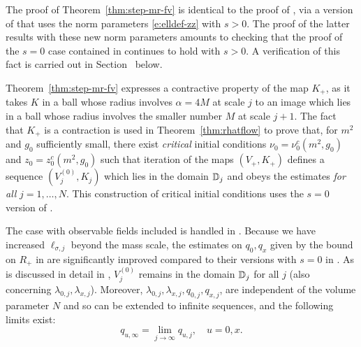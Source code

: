 The proof of Theorem~\ref{thm:step-mr-fv} is identical to the proof of
\cite[Theorem~\ref{phi4-thm:step-mr-fv}]{ST-phi4}, via a version of
\cite[Theorems~\ref{step-thm:mr-R}--\ref{step-thm:mr}]{BS-rg-step} that
uses the norm parameters \eqref{e:elldef-zz} with $s > 0$.
The proof of the latter results with these new norm parameters amounts to
checking that the proof of the $s = 0$ case contained in \cite{BS-rg-IE,BS-rg-step}
continues to hold with $s > 0$. A verification of this fact is carried
out in Section~\REF %
below.

Theorem~\ref{thm:step-mr-fv} expresses a contractive property of the map $K_+$,
as it takes $K$ in a ball whose radius involves $\alpha=4M$ at scale $j$ to
an image which lies in a ball whose radius involves the smaller number $M$
at scale $j+1$.  The fact that $K_+$ is a contraction is used in
Theorem~\ref{thm:rhatflow}
to prove that, for $m^2$ and $g_0$ sufficiently small, there exist
\emph{critical} initial conditions
$\nu_0 = \nu_0^c(m^2, g_0)$ and $z_0 = z_0^c(m^2, g_0)$ such that
iteration of the maps $(V_+,K_+)$ defines a sequence $(V_j^{(0)}, K_j)$
which lies in the domain $\mathbb{D}_j$ and obeys the estimates 
\emph{for all} $j = 1, \ldots, N$.
This construction of critical initial conditions uses the $s=0$ version
of .

The case with observable fields included is handled in \cite{ST-phi4}.
Because we have increased $\ell_{\sigma,j}$ beyond the mass scale, the
estimates on $q_0,q_x$ given by the bound on $R_+$ in  are
significantly improved compared to their versions with $s=0$ in \cite{ST-phi4}.
As is discussed in detail in  \cite[Section~\ref{phi4-sec:pfmr1}]{ST-phi4},
$V_j^{(0)}$ remains in the domain $\mathbb{D}_j$ for all $j$
(also concerning $\lambda_{0,j}, \lambda_{x,j}$).
Moreover,
$\lambda_{0,j}, \lambda_{x,j},q_{0,j},q_{x,j}$, are independent of the volume parameter $N$ and
so can be extended to infinite sequences, and the following limits exist:
\begin{equation}
q_{u,\infty} = \lim_{j\to\infty} q_{u,j}, \quad u = 0, x.
\end{equation}


